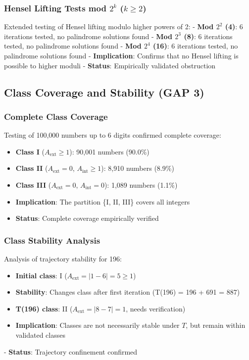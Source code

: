 \documentclass[12pt,a4paper]{article}
\begin{document}
\subsubsection{\texorpdfstring{Hensel Lifting Tests mod $2^k$ ($k \geq 2$)}{Hensel Lifting Tests mod 2^k (k >= 2)}}
Extended testing of Hensel lifting modulo higher powers of 2:
- \textbf{Mod $2^2$ (4)}: 6 iterations tested, no palindrome solutions found
- \textbf{Mod $2^3$ (8)}: 6 iterations tested, no palindrome solutions found  
- \textbf{Mod $2^4$ (16)}: 6 iterations tested, no palindrome solutions found
- \textbf{Implication}: Confirms that no Hensel lifting is possible to higher moduli
- \textbf{Status}: \checkmark Empirically validated obstruction

\subsection{Class Coverage and Stability (GAP 3)}

\subsubsection{Complete Class Coverage}
Testing of 100,000 numbers up to 6 digits confirmed complete coverage:
\begin{itemize}
\item \textbf{Class I} ($A_{\mathrm{ext}} \ge 1$): 90,001 numbers (90.0\%)
\item \textbf{Class II} ($A_{\mathrm{ext}} = 0$, $A_{\mathrm{int}} \ge 1$): 8,910 numbers (8.9\%)
\item \textbf{Class III} ($A_{\mathrm{ext}} = 0$, $A_{\mathrm{int}} = 0$): 1,089 numbers (1.1\%)
\item \textbf{Implication}: The partition \{I, II, III\} covers all integers
\item \textbf{Status}: \checkmark Complete coverage empirically verified
\end{itemize}

\subsubsection{Class Stability Analysis}
Analysis of trajectory stability for 196:
\begin{itemize}
\item \textbf{Initial class}: I ($A_{\mathrm{ext}} = |1-6| = 5 \ge 1$)
\item \textbf{Stability}: Changes class after first iteration (T(196) = 196 + 691 = 887)
\item \textbf{T(196) class}: II ($A_{\mathrm{ext}} = |8-7| = 1$, needs verification)
\item \textbf{Implication}: Classes are not necessarily stable under $T$, but remain within validated classes
\end{itemize}
- \textbf{Status}: \checkmark Trajectory confinement confirmed
\end{document}
